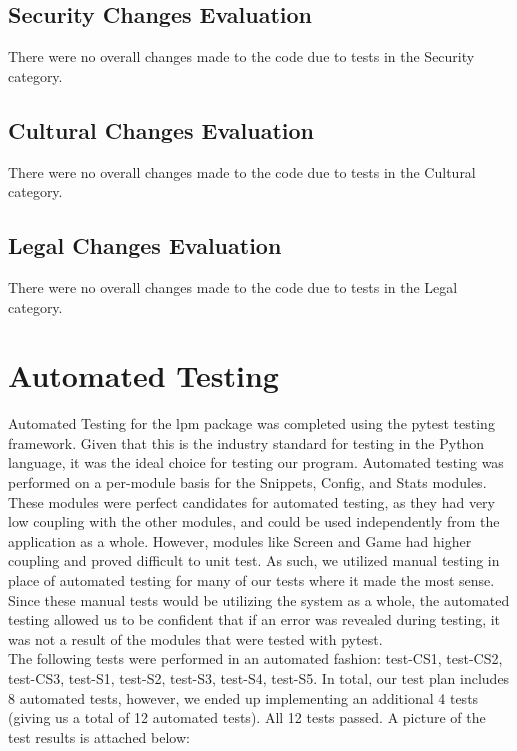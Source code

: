 \documentclass[12pt, titlepage]{article}
\begin{document}
\subsection{Security Changes Evaluation}
There were no overall changes made to the code due to tests in the Security category.

\subsection{Cultural Changes Evaluation}
There were no overall changes made to the code due to tests in the Cultural category.

\subsection{Legal Changes Evaluation}
There were no overall changes made to the code due to tests in the Legal category.

\section{Automated Testing} \label{Automated Testing}
Automated Testing for the lpm package was completed using the pytest testing framework. Given that this is the industry standard for testing in the Python language, it was the ideal choice for testing our program. Automated testing was performed on a per-module basis for the Snippets, Config, and Stats modules. These modules were perfect candidates for automated testing, as they had very low coupling with the other modules, and could be used independently from the application as a whole. However, modules like Screen and Game had higher coupling and proved difficult to unit test. As such, we utilized manual testing in place of automated testing for many of our tests where it made the most sense. Since these manual tests would be utilizing the system as a whole, the automated testing allowed us to be confident that if an error was revealed during testing, it was not a result of the modules that were tested with pytest. \\

The following tests were performed in an automated fashion: test-CS1, test-CS2, test-CS3, test-S1, test-S2, test-S3, test-S4, test-S5. In total, our test plan includes 8 automated tests, however, we ended up implementing an additional 4 tests (giving us a total of 12 automated tests). All 12 tests passed. A picture of the test results is attached below: \\
\end{document}
